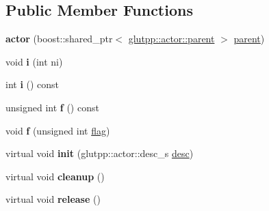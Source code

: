 \subsection*{\-Public \-Member \-Functions}
\begin{DoxyCompactItemize}
\item 
\hypertarget{classglutpp_1_1actor_1_1actor_ae22d4db12a83f03505e17f6d48eb1124}{{\bfseries actor} (boost\-::shared\-\_\-ptr$<$ \hyperlink{classglutpp_1_1actor_1_1parent}{glutpp\-::actor\-::parent} $>$ \hyperlink{classglutpp_1_1actor_1_1parent}{parent})}\label{classglutpp_1_1actor_1_1actor_ae22d4db12a83f03505e17f6d48eb1124}

\item 
\hypertarget{classglutpp_1_1actor_1_1actor_acc3a268bcb48b3e1899a5b68fa60ad4d}{void {\bfseries i} (int ni)}\label{classglutpp_1_1actor_1_1actor_acc3a268bcb48b3e1899a5b68fa60ad4d}

\item 
\hypertarget{classglutpp_1_1actor_1_1actor_abe95aade7e81053ae307b3c5c6ca6530}{int {\bfseries i} () const }\label{classglutpp_1_1actor_1_1actor_abe95aade7e81053ae307b3c5c6ca6530}

\item 
\hypertarget{classglutpp_1_1actor_1_1actor_a637f3951329b0002c0834295ae9b82d0}{unsigned int {\bfseries f} () const }\label{classglutpp_1_1actor_1_1actor_a637f3951329b0002c0834295ae9b82d0}

\item 
\hypertarget{classglutpp_1_1actor_1_1actor_a979cbbb3fd55f5bfdc618fbaa63784a6}{void {\bfseries f} (unsigned int \hyperlink{structglutpp_1_1actor_1_1actor_1_1flag}{flag})}\label{classglutpp_1_1actor_1_1actor_a979cbbb3fd55f5bfdc618fbaa63784a6}

\item 
\hypertarget{classglutpp_1_1actor_1_1actor_a384324368dcbe229b6d9b274427f3d12}{virtual void {\bfseries init} (glutpp\-::actor\-::desc\-\_\-s \hyperlink{classglutpp_1_1actor_1_1desc}{desc})}\label{classglutpp_1_1actor_1_1actor_a384324368dcbe229b6d9b274427f3d12}

\item 
\hypertarget{classglutpp_1_1actor_1_1actor_a81deff185f60ffab9373fb68257221fb}{virtual void {\bfseries cleanup} ()}\label{classglutpp_1_1actor_1_1actor_a81deff185f60ffab9373fb68257221fb}

\item 
\hypertarget{classglutpp_1_1actor_1_1actor_a3e31d7fa4231564b9b6c98d93c6a8d17}{virtual void {\bfseries release} ()}\label{classglutpp_1_1actor_1_1actor_a3e31d7fa4231564b9b6c98d93c6a8d17}


\end{DoxyCompactItemize}
